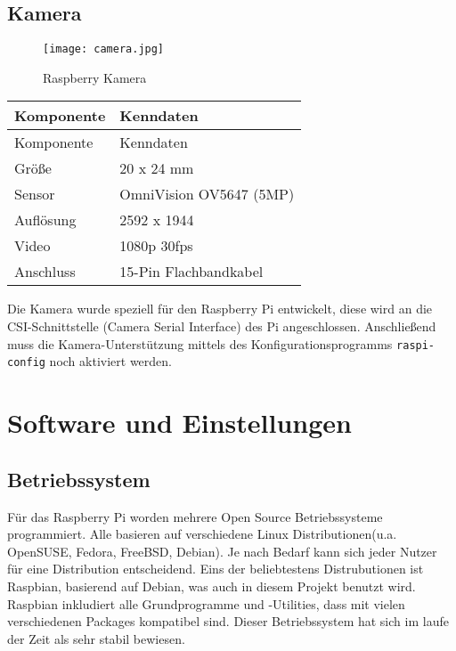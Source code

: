 \subsection{Kamera}

\begin{figure}[h]
  \begin{center}		%
    \texttt{[image: camera.jpg]}
  		  \caption{Raspberry Kamera}
     \label{raspCam}
  \end{center}
\end{figure}


\begin{longtable}{||l|l||}

\hline
Komponente & Kenndaten\\ \hline\hline
\endfirsthead
\hline
Komponente & Kenndaten \\ \hline\hline
\endhead

Größe & 20 x 24 mm\\ \hline
Sensor & OmniVision OV5647 (5MP)\\ \hline
Auflösung & 2592 x 1944\\ \hline
Video & 1080p \@ 30fps \\ \hline
Anschluss & 15-Pin Flachbandkabel\\ \hline

\end{longtable}

Die Kamera wurde speziell für den Raspberry Pi entwickelt, diese wird an die CSI-Schnittstelle (Camera Serial Interface) des Pi angeschlossen. Anschließend muss die Kamera-Unterstützung mittels des Konfigurationsprogramms \texttt{raspi-config} noch aktiviert werden.

\newpage

\section{Software und Einstellungen}

\subsection{Betriebssystem}
Für das Raspberry Pi worden mehrere Open Source Betriebssysteme programmiert. Alle basieren auf verschiedene Linux Distributionen(u.a. OpenSUSE, Fedora, FreeBSD, Debian). Je nach Bedarf kann sich jeder Nutzer für eine Distribution entscheidend. Eins der beliebtestens Distrubutionen ist Raspbian, basierend auf Debian, was auch in diesem Projekt benutzt wird. Raspbian inkludiert alle Grundprogramme und -Utilities, dass mit vielen verschiedenen Packages kompatibel sind. Dieser Betriebssystem hat sich im laufe der Zeit als sehr stabil bewiesen.\\

